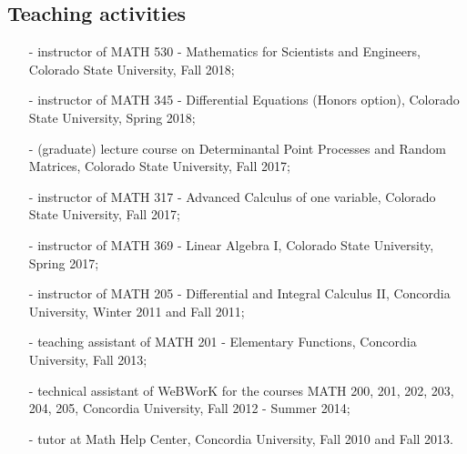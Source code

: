 \documentclass[margin]{res}
\begin{document}
\begin{resume}



  \section{Teaching activities}
 \begin{itemize} \itemsep -2pt  %
\item[-] instructor of MATH 530 - Mathematics for Scientists and Engineers,  Colorado State University, Fall 2018;
\item[-] instructor of MATH 345 - Differential Equations (Honors option), Colorado State University, Spring 2018;
\item[-] (graduate) lecture course on Determinantal Point Processes and Random Matrices, Colorado State University, Fall 2017;
\item[-] instructor of MATH 317 - Advanced Calculus of one variable, Colorado State University, Fall 2017;
\item[-] instructor of MATH 369 - Linear Algebra I, Colorado State University, Spring 2017;
\item[-] instructor of MATH 205 - Differential and Integral Calculus II, Concordia University, Winter 2011 and Fall 2011;
\item[-] teaching assistant of MATH 201 - Elementary Functions, Concordia University, Fall 2013;
\item[-] technical assistant of WeBWorK for the courses MATH 200, 201, 202, 203, 204, 205, Concordia University, Fall 2012 - Summer 2014;
\item[-] tutor at Math Help Center, Concordia University, Fall 2010 and Fall 2013. \\
 \end{itemize}


\end{resume}
\end{document}
